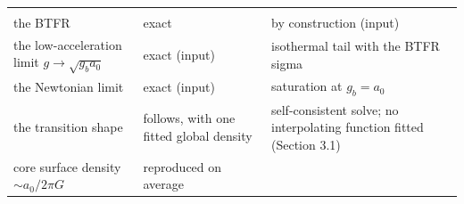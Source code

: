 \documentclass[
  10pt,
]{article}
\begin{document}
\begin{longtable}[]{@{}lll@{}}
\begin{minipage}[t]{0.50\columnwidth}
\strut
\end{minipage}\tabularnewline
\begin{minipage}[t]{0.24\columnwidth}\raggedright
the BTFR\strut
\end{minipage} & \begin{minipage}[t]{0.20\columnwidth}\raggedright
exact\strut
\end{minipage} & \begin{minipage}[t]{0.50\columnwidth}\raggedright
by construction (input)\strut
\end{minipage}\tabularnewline
\begin{minipage}[t]{0.24\columnwidth}\raggedright
the low-acceleration limit $g\to\sqrt{g_b a_0}$\strut
\end{minipage} & \begin{minipage}[t]{0.20\columnwidth}\raggedright
exact (input)\strut
\end{minipage} & \begin{minipage}[t]{0.50\columnwidth}\raggedright
isothermal tail with the BTFR sigma\strut
\end{minipage}\tabularnewline
\begin{minipage}[t]{0.24\columnwidth}\raggedright
the Newtonian limit\strut
\end{minipage} & \begin{minipage}[t]{0.20\columnwidth}\raggedright
exact (input)\strut
\end{minipage} & \begin{minipage}[t]{0.50\columnwidth}\raggedright
saturation at $g_b=a_0$\strut
\end{minipage}\tabularnewline
\begin{minipage}[t]{0.24\columnwidth}\raggedright
the transition shape\strut
\end{minipage} & \begin{minipage}[t]{0.20\columnwidth}\raggedright
follows, with one fitted global density\strut
\end{minipage} & \begin{minipage}[t]{0.50\columnwidth}\raggedright
self-consistent solve; no interpolating function fitted (Section 3.1)\strut
\end{minipage}\tabularnewline
\begin{minipage}[t]{0.24\columnwidth}\raggedright
core surface density $\sim a_0/2\pi G$\strut
\end{minipage} & \begin{minipage}[t]{0.20\columnwidth}\raggedright
reproduced on average\strut

\end{minipage}
\end{longtable}
\end{document}

